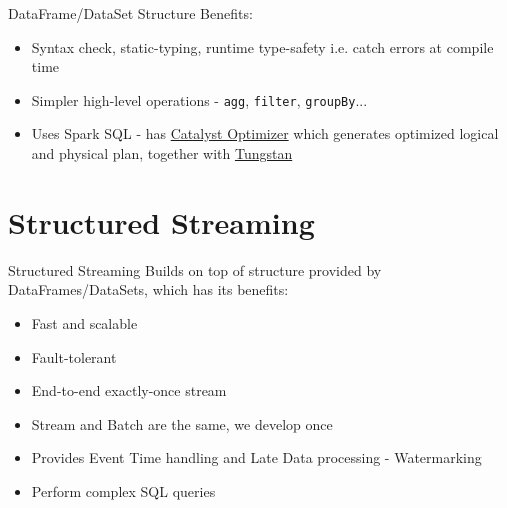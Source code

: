 \documentclass{beamer}
\begin{document}
\begin{frame}[t]{DataFrame/DataSet}
Structure Benefits:
\begin{itemize}
	\item<1-> Syntax check, static-typing, runtime type-safety i.e. catch errors at compile time
	\item<2-> Simpler high-level operations - \texttt{agg}, \texttt{filter}, \texttt{groupBy}...
	\item<3-> Uses Spark SQL - has \href{https://www.databricks.com/glossary/catalyst-optimizer}{Catalyst Optimizer} which generates optimized logical and physical plan, together with \href{https://www.databricks.com/glossary/tungsten}{Tungstan}
\end{itemize}
\end{frame}

\section{Structured Streaming}
\begin{frame}{Structured Streaming}
Builds on top of structure provided by DataFrames/DataSets, which has its benefits:
\begin{itemize}
	\item<1-> Fast and scalable
	\item<2-> Fault-tolerant
	\item<3-> End-to-end exactly-once stream
	\item<4-> Stream and Batch are the same, we develop once
	\item<5-> Provides Event Time handling and Late Data processing - Watermarking
	\item<6-> Perform complex SQL queries
\end{itemize}
\end{frame}
\end{document}
